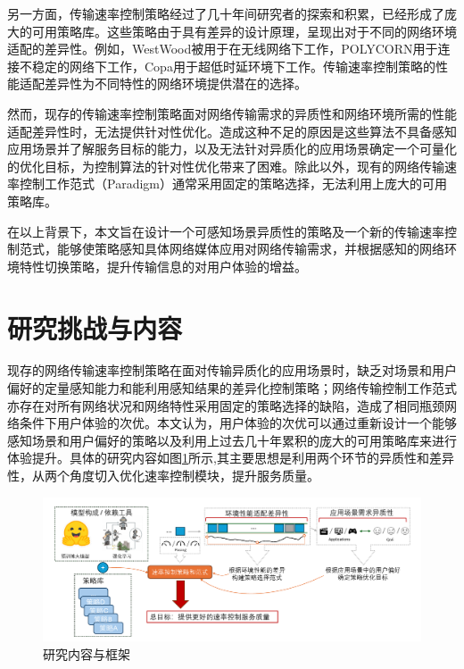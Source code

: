 另一方面，传输速率控制策略经过了几十年间研究者的探索和积累，已经形成了庞大的可用策略库。这些策略由于具有差异的设计原理，呈现出对于不同的网络环境适配的差异性。例如，WestWood\cite{casetti2002tcp}被用于在无线网络下工作，POLYCORN\cite{ni2023polycorn}用于连接不稳定的网络下工作，Copa\cite{arun2018copa}用于超低时延环境下工作。传输速率控制策略的性能适配差异性为不同特性的网络环境提供潜在的选择。

然而，现存的传输速率控制策略面对网络传输需求的异质性和网络环境所需的性能适配差异性时，无法提供针对性优化。造成这种不足的原因是这些算法不具备感知应用场景并了解服务目标的能力，以及无法针对异质化的应用场景确定一个可量化的优化目标，为控制算法的针对性优化带来了困难。除此以外，现有的网络传输速率控制工作范式（Paradigm）通常采用固定的策略选择，无法利用上庞大的可用策略库。


在以上背景下，本文旨在设计一个可感知场景异质性的策略及一个新的传输速率控制范式，能够使策略感知具体网络媒体应用对网络传输需求，并根据感知的网络环境特性切换策略，提升传输信息的对用户体验的增益。

\section{研究挑战与内容}
现存的网络传输速率控制策略在面对传输异质化的应用场景时，缺乏对场景和用户偏好的定量感知能力和能利用感知结果的差异化控制策略；网络传输控制工作范式亦存在对所有网络状况和网络特性采用固定的策略选择的缺陷，造成了相同瓶颈网络条件下用户体验的次优。本文认为，用户体验的次优可以通过重新设计一个能够感知场景和用户偏好的策略以及利用上过去几十年累积的庞大的可用策略库来进行体验提升。具体的研究内容如图\ref{fig:final_goal}所示,其主要思想是利用两个环节的异质性和差异性，从两个角度切入优化速率控制模块，提升服务质量。

\begin{figure} [ht]
\centering
\includegraphics[width=\textwidth]{figures/chap01/final_goal.pdf} 
\caption{研究内容与框架}
\label{fig:final_goal}
\end{figure}


